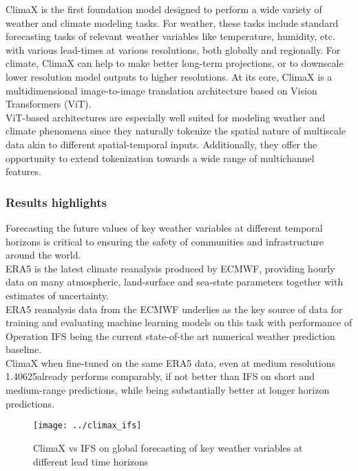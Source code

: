 \documentclass[../paper.tex]{subfiles}
\begin{document}
    ClimaX is the first foundation model designed to perform a wide variety of weather and climate modeling tasks.
    For weather, these tasks include standard forecasting tasks of relevant weather variables like temperature,
    humidity, etc.
    with various lead-times at various resolutions, both globally and regionally.
    For climate, ClimaX can help to make better long-term projections,
    or to downscale lower resolution model outputs to higher resolutions.
    At its core, ClimaX is a multidimensional image-to-image translation architecture based on Vision Transformers
    (ViT).\\
    ViT-based architectures are especially well suited for modeling weather and climate phenomena
    since they naturally tokenize the spatial nature of multiscale data akin to different spatial-temporal inputs.
    Additionally, they offer the opportunity to extend tokenization towards a wide range of multichannel features.\cite{c1}
    \subsubsection{Results highlights}
        Forecasting the future values of key weather variables at different temporal horizons is critical
        to ensuring the safety of communities and infrastructure around the world.\\
        ERA5 is the latest climate reanalysis produced by ECMWF,
        providing hourly data on many atmospheric,
        land-surface and sea-state parameters together with estimates of uncertainty.\cite{c2} \\
        ERA5 reanalysis data from the ECMWF underlies as the key source of data for training
        and evaluating machine learning models on this task with performance of Operation
        IFS being the current state-of-the art numerical weather prediction baseline.\\
        ClimaX when fine-tuned on the same ERA5 data,
        even at medium resolutions 1.40625\textdegree already performs comparably,
        if not better than IFS on short and medium-range predictions,
        while being substantially better at longer horizon predictions.
        \begin{figure}[htbp]
        \centerline{\texttt{[image: ../climax\_ifs]}}
        \caption{ClimaX vs IFS on global forecasting of key weather variables at different lead time horizons}
        \label{fig:climax-vs-ifs}
        \end{figure}
\end{document}
